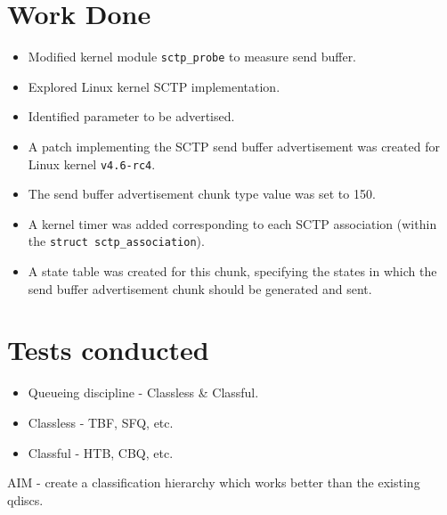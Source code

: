 \documentclass{beamer}
\begin{document}
\section{Work Done}
\begin{frame}{\insertsection}
  \begin{itemize}
    \item Modified kernel module \texttt{sctp\_probe} to measure send buffer.
    \item Explored Linux kernel SCTP implementation.
    \item Identified parameter to be advertised.
    \item A patch implementing the SCTP send buffer advertisement was created for
      Linux kernel \texttt{v4.6-rc4}.
    \item The send buffer advertisement chunk type value was set to 150.
    \item A kernel timer was added corresponding to each SCTP association
      (within the \texttt{struct sctp\_association}).
    \item A state table was created for this chunk, specifying the states in which
      the send buffer advertisement chunk should be generated and sent.
  \end{itemize}
\end{frame}

\section{Tests conducted}
\begin{frame}{\insertsection}
  \begin{itemize}
    \item Queueing discipline - Classless \& Classful.
    \item Classless - TBF, SFQ, etc.
    \item Classful - HTB, CBQ, etc.
  \end{itemize}
  AIM - create a classification hierarchy which works better than the existing
  qdiscs.
\end{frame}
\end{document}
